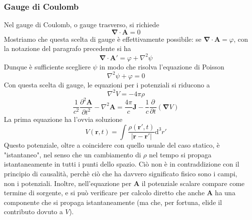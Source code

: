 \documentclass[a4paper,11pt]{book}
\newcommand{\dif}{\mathrm{d}}
\newcommand{\der}[3][]{\frac{\partial ^{#1}#2}{\partial {#3}^{#1}}}
\let\oldnabla\nabla
\renewcommand{\nabla}{\vec{\oldnabla}}
\newcommand{\lap}{\oldnabla^2}
\renewcommand{\vec}[1]{\mathbf{#1}}
\theoremstyle{theorem}
\theoremstyle{definition}
\begin{document}
\subsubsection{Gauge di Coulomb}
Nel gauge di Coulomb, o gauge trasverso, si richiede
\[\nabla\cdot\vec{A}=0\]
Mostriamo che questa scelta di gauge è effettivamente possibile: se $\nabla\cdot\vec{A}=\varphi$, con la notazione del paragrafo precedente si ha
\[\nabla\cdot\vec{A}'=\varphi+\lap\psi\]
Dunque è sufficiente scegliere $\psi$ in modo che risolva l'equazione di Poisson
\[\lap\psi+\varphi=0\]
Con questa scelta di gauge, le equazioni per i potenziali si riducono a
\[\lap V=-4\pi\rho\]
\[\frac{1}{c^2}\der[2]{\vec{A}}{t}-\lap\vec{A}=\frac{4\pi}{c}\vec{J}-\frac{1}{c}\der{}{t}(\nabla V)\]
La prima equazione ha l'ovvia soluzione
\[V(\vec{r},t)=\int\frac{\rho(\vec{r}',t)}{|\vec{r}-\vec{r}'|}\dif^3r'\]
Questo potenziale, oltre a coincidere con quello usuale del caso statico, è "istantaneo", nel senso che un cambiamento di $\rho$ nel tempo si propaga istantaneamente in tutti i punti dello spazio. Ciò non è in contraddizione con il principio di causalità, perchè ciò che ha davvero significato fisico sono i campi, non i potenziali. Inoltre, nell'equazione per $\vec{A}$ il potenziale scalare compare come termine di sorgente, e si può verificare per calcolo diretto che anche $\vec{A}$ ha una componente che si propaga istantaneamente (ma che, per fortuna, elide il contributo dovuto a $V$).
\end{document}
